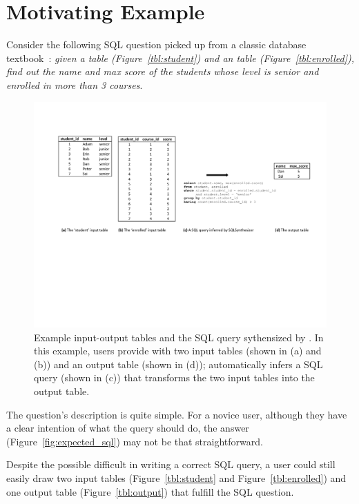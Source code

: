 \section{Motivating Example}
\label{sec:example}

Consider the following SQL question picked up from a classic
database textbook~\cite{cowbook}: \textit{given a  table (Figure~\ref{tbl:student})
and an  table (Figure~\ref{tbl:enrolled}), find out the name and max score of the
students whose level is senior and enrolled in more than 3 courses}.


\begin{figure}[t]
  \centering
  \includegraphics[scale=0.70]{motivating}
  \vspace*{-1.0ex}\caption {{\label{fig:motivating}
  Example input-output tables and the SQL query sythensized by
  \ourtool. In this example, users provide \ourtool with
  two input tables (shown in (a) and (b)) and an output table (shown in (d));
  \ourtool automatically infers a SQL query (shown in (c)) that
  transforms the two input tables into the output table.
}}
\end{figure}


The question's description is quite simple.
For a novice user, although they have a clear
intention of what the query should do, the answer (Figure~\ref{fig:expected_sql}) may
not be that straightforward. 

Despite the possible difficult in writing a correct SQL query,
a user could still easily draw
two input tables (Figure~\ref{tbl:student} and Figure~\ref{tbl:enrolled})
and one output table (Figure~\ref{tbl:output}) that fulfill the
SQL question.

